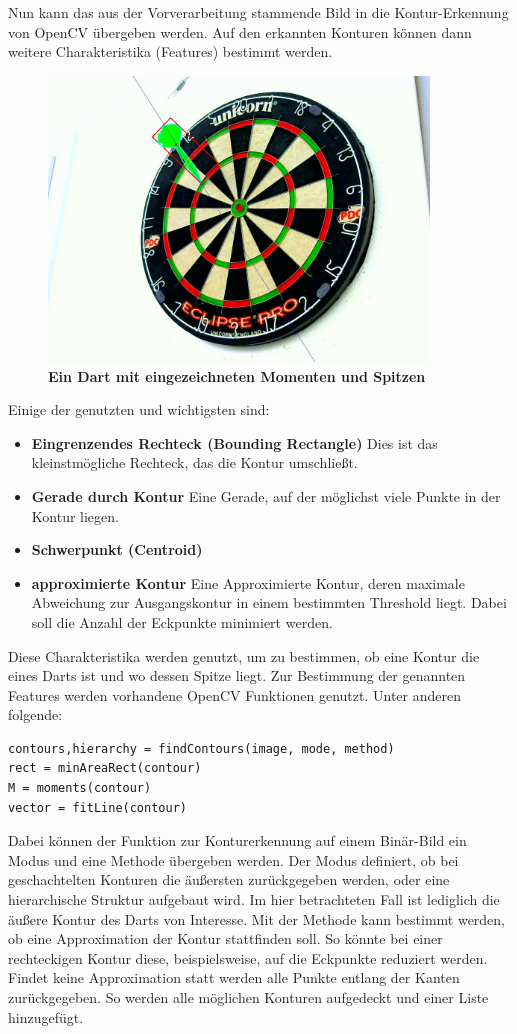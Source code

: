 Nun kann das aus der Vorverarbeitung stammende Bild in die Kontur-Erkennung von OpenCV übergeben werden. Auf den erkannten Konturen können dann weitere Charakteristika (Features) bestimmt werden. 
\begin{figure}[ht]
\centering
\includegraphics[width=0.9\textwidth]{media/backgroundfeature}
\caption{\textbf{Ein Dart mit eingezeichneten Momenten und Spitzen}}
\label{Fig:detecteddart}
\end{figure}
\newpage
Einige der genutzten und wichtigsten sind:
\begin{itemize}
	\item \textbf{Eingrenzendes Rechteck (Bounding Rectangle)} Dies ist das kleinstmögliche Rechteck, das die Kontur umschließt.
	\item \textbf{Gerade durch Kontur} Eine Gerade, auf der möglichst viele Punkte in der Kontur liegen.
	\item \textbf{Schwerpunkt (Centroid)} 
	\item \textbf{approximierte Kontur} Eine Approximierte Kontur, deren maximale Abweichung zur Ausgangskontur in einem bestimmten Threshold liegt. Dabei soll die Anzahl der Eckpunkte minimiert werden.
\end{itemize}
Diese Charakteristika werden genutzt, um zu bestimmen, ob eine Kontur die eines Darts ist und wo dessen Spitze liegt. Zur Bestimmung der genannten Features werden vorhandene OpenCV Funktionen genutzt. Unter anderen folgende:
\begin{lstlisting}[frame=single]
contours,hierarchy = findContours(image, mode, method)
rect = minAreaRect(contour)
M = moments(contour)
vector = fitLine(contour)
\end{lstlisting}
Dabei können der Funktion zur Konturerkennung auf einem Binär-Bild ein Modus und eine Methode übergeben werden. Der Modus definiert, ob bei geschachtelten Konturen die äußersten zurückgegeben werden, oder eine hierarchische Struktur aufgebaut wird. Im hier betrachteten Fall ist lediglich die äußere Kontur des Darts von Interesse. Mit der Methode kann bestimmt werden, ob eine Approximation der Kontur stattfinden soll. So könnte bei einer rechteckigen Kontur diese, beispielsweise, auf die Eckpunkte reduziert werden. Findet keine Approximation statt werden alle Punkte entlang der Kanten zurückgegeben. So werden alle möglichen Konturen aufgedeckt und einer Liste hinzugefügt.

